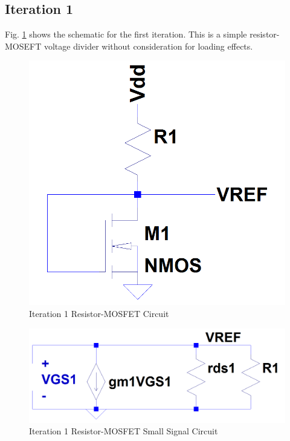 \documentclass[conference]{IEEEtran}
\begin{document}
\subsection{Iteration 1}
Fig. \ref{fig:resistor-mosfet1} shows the schematic for the first iteration.  This is a simple resistor-MOSEFT voltage divider without consideration for loading effects.
\begin{figure}[htb]
  \centering
  \includegraphics[scale=0.25]{images/resistor-mosfet1.png}
  \caption[resistor1]{Iteration 1 Resistor-MOSFET Circuit}
  \label{fig:resistor-mosfet1}
\end{figure}

\begin{figure}[htb]
  \centering
  \includegraphics[scale=0.25]{images/resistor-mosfet1-ss.png}
  \caption[resistor1-ss]{Iteration 1 Resistor-MOSFET Small Signal Circuit}
  \label{fig:resistor-mosfet1-ss}
\end{figure}
\end{document}
